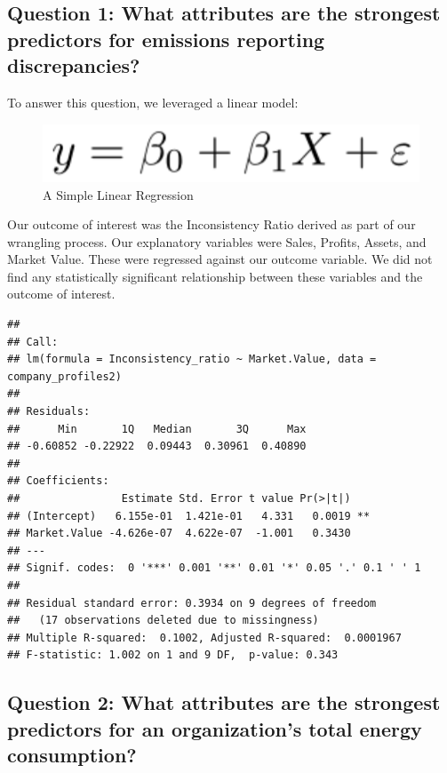 \documentclass[
  12pt,
]{article}
\begin{document}
\hypertarget{question-1-what-attributes-are-the-strongest-predictors-for-emissions-reporting-discrepancies}{%
\subsection{Question 1: What attributes are the strongest predictors for
emissions reporting
discrepancies?}\label{question-1-what-attributes-are-the-strongest-predictors-for-emissions-reporting-discrepancies}}

To answer this question, we leveraged a linear model:

\begin{figure}
\centering
\includegraphics{./BoothProphete_Report_files/figure-latex/Linear_regression.png}
\caption{A Simple Linear Regression}
\end{figure}

Our outcome of interest was the Inconsistency Ratio derived as part of
our wrangling process. Our explanatory variables were Sales, Profits,
Assets, and Market Value. These were regressed against our outcome
variable. We did not find any statistically significant relationship
between these variables and the outcome of interest.

\begin{verbatim}
## 
## Call:
## lm(formula = Inconsistency_ratio ~ Market.Value, data = company_profiles2)
## 
## Residuals:
##      Min       1Q   Median       3Q      Max 
## -0.60852 -0.22922  0.09443  0.30961  0.40890 
## 
## Coefficients:
##                Estimate Std. Error t value Pr(>|t|)   
## (Intercept)   6.155e-01  1.421e-01   4.331   0.0019 **
## Market.Value -4.626e-07  4.622e-07  -1.001   0.3430   
## ---
## Signif. codes:  0 '***' 0.001 '**' 0.01 '*' 0.05 '.' 0.1 ' ' 1
## 
## Residual standard error: 0.3934 on 9 degrees of freedom
##   (17 observations deleted due to missingness)
## Multiple R-squared:  0.1002, Adjusted R-squared:  0.0001967 
## F-statistic: 1.002 on 1 and 9 DF,  p-value: 0.343
\end{verbatim}

\hypertarget{question-2-what-attributes-are-the-strongest-predictors-for-an-organizations-total-energy-consumption}{%
\subsection{Question 2: What attributes are the strongest predictors for
an organization's total energy
consumption?}\label{question-2-what-attributes-are-the-strongest-predictors-for-an-organizations-total-energy-consumption}}
\end{document}
